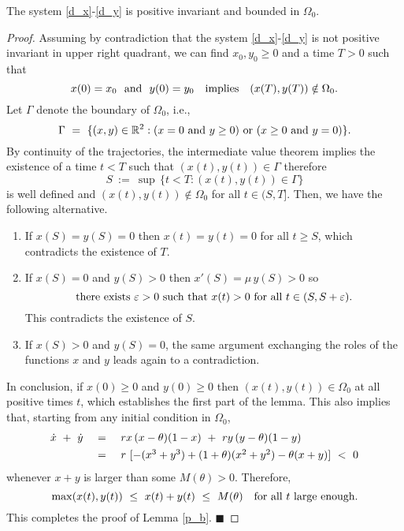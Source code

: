\begin{lemma}
\label{p_b}
 The system \eqref{d_x}-\eqref{d_y} is positive invariant and bounded in $\Omega_0$.
\end{lemma}
\begin{proof}
 Assuming by contradiction that the system \eqref{d_x}-\eqref{d_y} is not positive invariant in upper right quadrant,
 we can find $x_0, y_0 \geq 0$ and a time $T > 0$ such that
 $$ x (0) = x_0 \ \ \hbox{and} \ \ y (0) = y_0 \quad \hbox{implies} \quad (x (T), y (T)) \notin \Omega_0. $$
 Let $\Gamma$ denote the boundary of $\Omega_0$, i.e.,
 $$ \Gamma \ = \ \{(x, y) \in {{\mathbb{R}}}^2 : (x = 0 \ \hbox{and} \ y \geq 0) \ \hbox{or} \ (x \geq 0 \ \hbox{and} \ y = 0) \}. $$
 By continuity of the trajectories, the intermediate value theorem implies the existence of a time $t < T$ such that
 $(x (t), y (t)) \in \Gamma$ therefore
 $$ S \ := \ \sup \,\{t < T : (x (t), y (t)) \in \Gamma \} $$
 is well defined and $(x (t), y (t)) \notin \Omega_0$ for all $t \in (S, T]$.
 Then, we have the following alternative.
\begin{enumerate}
\item If $x (S) = y (S) = 0$ then $x (t) = y (t) = 0$ for all $t \geq S$, which contradicts the existence of $T$. \vspace{4pt}
\item If $x (S) = 0$ and $y (S) > 0$ then $x' (S) = \mu \,y (S) > 0$ so
 $$ \hbox{there exists} \ {\mbox{$\varepsilon$}} > 0 \ \hbox{such that} \ x (t) > 0 \ \hbox{for all} \ t \in (S, S + {\mbox{$\varepsilon$}}). $$
 This contradicts the existence of $S$. \vspace{4pt}
\item If $x (S) > 0$ and $y (S) = 0$, the same argument exchanging the roles of the functions $x$ and $y$ leads again to a contradiction.
\end{enumerate}
 In conclusion, if $x (0) \geq 0$ and $y (0) \geq 0$ then $(x (t), y (t)) \in \Omega_0$ at all positive times $t$, which establishes the
 first part of the lemma.
 This also implies that, starting from any initial condition in $\Omega_0$,
 $$ \begin{array}{rcl}
    \dot{x} \ + \ \dot{y} \ & = & \ rx \,(x - \theta) (1 - x) \ + \ ry \,(y - \theta) (1 - y) \vspace{4pt} \\
                          \ & = & \ r \ [- (x^3 + y^3) + (1 + \theta) (x^2 + y^2) - \theta (x + y)] \ < \ 0 \end{array} $$
 whenever $x + y$ is larger than some $M (\theta) > 0$.
 Therefore,
 $$ \max (x (t), y (t)) \ \leq \ x (t) + y (t) \ \leq \ M (\theta) \quad \hbox{for all $t$ large enough}. $$
 This completes the proof of Lemma \ref{p_b}. \hspace{2mm} $\blacksquare$
\end{proof}


